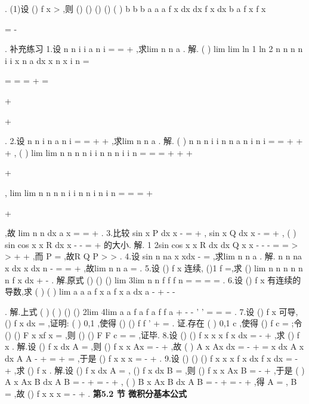 \int 
\int 
\int 
\int 
\int 
. 
(1)设
()
f x >
,则
()
()
()
()
(
)
b
b
b
a
a
a
f x dx
dx
f x
dx
b
a
f x
f x




\cdots 
\ge 
\cdots 
=
-




\int 
\int 
\int 
. 
\textcolor{lyred}{补充练习 }
1.设
n
n
i
i
a
n
i
=
=
+
\sum 
,求lim
n
n
a
\to \infty 
.\textcolor{lyred}{ }
解.
(
)
lim
lim
ln 1
ln 2
n
n
n
n
i
i
x
n
a
dx
x
n
x
i
n
\to \infty 
\to \infty 
=


=
=
=
+
=


+


+



\sum 
\int 
. 
2.设
n
n
i
n
a
n
i
=
=
+
+
\sum 
,求lim
n
n
a
\to \infty 
. 
解.
(
)
n
n
n
i
i
n
n
a
n
i
n
i
=
=
\le 
\le 
+
+
+
\sum 
\sum 
,
(
)
lim
lim
n
n
n
n
i
i
n
n
n
i
i
n
\to \infty 
\to \infty 
=
=
=
+
+
+


+



\sum 
\sum 
, 
lim
lim
n
n
n
n
i
i
n
n
i
n
i
n
\to \infty 
\to \infty 
=
=
=
+


+



\sum 
\sum 
,故
lim
n
n
dx
a
x
\pi 
\to \infty 
=
=
+
\int 
. 
3.比较
sin
x
P
dx
x
\pi 
\pi 
-
=
+
\int 
,
sin
x
Q
dx
x
\pi 
\pi 
-
=
+
\int 
,
(
)
sin
cos
x
x
R
dx
x
\pi 
\pi 
-
-
=
+
\int 
的大小. 
解.
1 2sin cos
x
x
R
dx
dx
Q
x
x
\pi 
\pi 
\pi 
\pi 
-
-
-
=
=
>
>
+
+
\int 
\int 
,而
P =
,故R
Q
P
>
>
. 
4.设
sin
n
na
x
xdx
-
=\int 
,求lim
n
n
a
\to \infty 
. 
解.
n
n
na
x dx
x dx
n
-
\le 
=
=
+
\int 
\int 
,故lim
n
n
a
\to \infty 
=
. 
5.设
()
f x 连续,
()1
f
=,求
()
lim
n
n
n
n
n
n
f x dx
+
\to \infty 
-\int 
. 
解.原式
()
()
()
lim
3lim
n
n f
f
f
n
\psi 
\psi 
\psi 
\to \infty 
\to 
=
\cdots 
\cdots 
=
=
=
. 
6.设
()
f x 有连续的导数,求
(
)
(
)
lim
a
a
a
f x
a
f x
a
dx
a
\to 
-
+
-
-




\int 
. 
解.上式
(
)
(
)
()
()
2lim
4lim
a
a
f
a
f
a
f
f
a
\psi 
\psi 
\eta 
\to 
\to 
+
-
-
'
'
=
=
=
. 
7.设
()
f x 可导,
()
f x dx =
\int 
,证明:
(
)
0,1
\psi 
\exists \in 
,使得
()
()
f
f
\psi 
\psi 
\psi 
'
+
=
. 
证.存在
(
)
0,1
c\in 
,使得
()
f c =
;令
()
()
F x
xf x
=
,则
()
()
F
F c
=
=
,证毕. 
8.设
()
()
f x
x
x
f x dx
=
-
+\int 
,求
()
f x . 
解.设
()
f x dx
A
=
\int 
,则
()
f x
x
Ax
=
-
+
,故
(
)
A
x
Ax
dx
=
-
+
=
\int 
x dx
A x dx
A
A
\pi 
\pi 
-
+
=
+
\Rightarrow 
=
\int 
\int 
,于是
()
f x
x
x
\pi 
=
-
+
. 
9.设
()
()
()
f x
x
x
f x dx
f x dx
=
-
+
\int 
\int 
,求
()
f x . 
解.设
()
f x dx
A
=
\int 
,
()
f x dx
B
=
\int 
,则
()
f x
x
Ax
B
=
-
+
,于是 
(
)
A
x
Ax
B dx
A
B
=
-
+
=
-
+
\int 
,
(
)
B
x
Ax
B dx
A
B
=
-
+
=
-
+
\int 
,得 
A =
,
B =
,故
()
f x
x
x
=
-
+
. 
\vspace{6pt}
{\large \bfseries \textcolor{lyred}{第5.2 节 微积分基本公式}}

